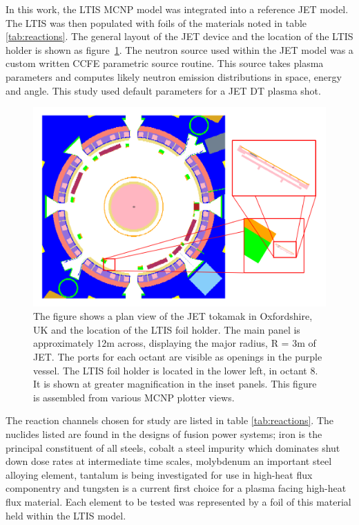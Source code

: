 In this work, the LTIS MCNP model \cite{lengar2017} was integrated into a reference JET model. The LTIS was then populated with foils of the materials noted in table \ref{tab:reactions}. The general layout of the JET device and the location of the LTIS holder is shown as figure~\ref{fig:jet_mcnp}. The neutron source used within the JET model was a custom written CCFE parametric source routine. This source takes plasma parameters and computes likely neutron emission distributions in space, energy and angle. This study used default parameters for a JET DT plasma shot.

\begin{figure}[H]
  \centering
  \includegraphics[width=\linewidth]{jet_mcnp_inset}
  \caption{The figure shows a plan view of the JET tokamak in Oxfordshire, UK and the location of the LTIS foil holder. The main panel is approximately 12m across, displaying the major radius, R = 3m of JET. The ports for each octant are visible as openings in the purple vessel. The LTIS foil holder is located in the lower left, in octant 8. It is shown at greater magnification in the inset panels. This figure is assembled from various MCNP plotter views.}
  \label{fig:jet_mcnp}
\end{figure}

The reaction channels chosen for study are listed in table \ref{tab:reactions}. The nuclides listed are found in the designs of fusion power systems; iron is the principal constituent of all steels, cobalt a steel impurity which dominates shut down dose rates at intermediate time scales, molybdenum an important steel alloying element, tantalum is being investigated for use in high-heat flux componentry and tungsten is a current first choice for a plasma facing high-heat flux material. Each element to be tested was represented by a foil of this material held within the LTIS model.


